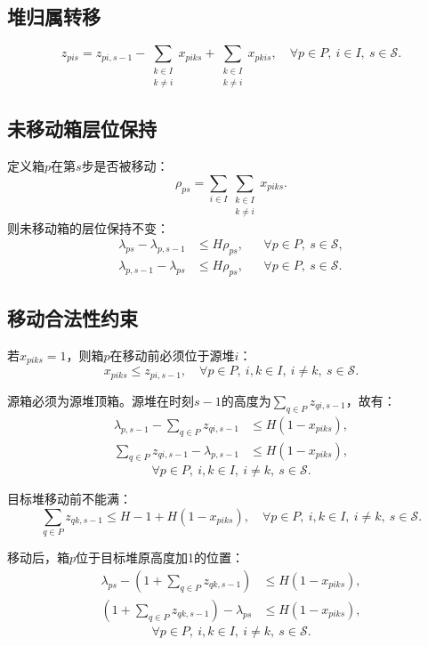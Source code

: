 \documentclass[11pt,a4paper]{ctexart}
\begin{document}
\subsection{堆归属转移}
\begin{equation}
z_{pis}=z_{pi,s-1}
-\sum_{\substack{k\in I\\k\ne i}}x_{piks}
+\sum_{\substack{k\in I\\k\ne i}}x_{pkis},
\quad \forall p\in P,\ i\in I,\ s\in\mathcal{S}.
\end{equation}

\subsection{未移动箱层位保持}
定义箱$p$在第$s$步是否被移动：
\begin{equation}
\rho_{ps}=\sum_{i\in I}\sum_{\substack{k\in I\\k\ne i}}x_{piks}.
\end{equation}
则未移动箱的层位保持不变：
\begin{align}
\lambda_{ps}-\lambda_{p,s-1} &\le H\rho_{ps},
&& \forall p\in P,\ s\in\mathcal{S},\\
\lambda_{p,s-1}-\lambda_{ps} &\le H\rho_{ps},
&& \forall p\in P,\ s\in\mathcal{S}.
\end{align}

\subsection{移动合法性约束}
若$x_{piks}=1$，则箱$p$在移动前必须位于源堆$i$：
\begin{equation}
x_{piks}\le z_{pi,s-1},
\quad \forall p\in P,\ i,k\in I,\ i\ne k,\ s\in\mathcal{S}.
\end{equation}

源箱必须为源堆顶箱。源堆在时刻$s-1$的高度为$\sum_{q\in P}z_{qi,s-1}$，故有：
\begin{align}
\lambda_{p,s-1}-\sum_{q\in P}z_{qi,s-1}
&\le H(1-x_{piks}),\\
\sum_{q\in P}z_{qi,s-1}-\lambda_{p,s-1}
&\le H(1-x_{piks}),
\end{align}
\[
\forall p\in P,\ i,k\in I,\ i\ne k,\ s\in\mathcal{S}.
\]

目标堆移动前不能满：
\begin{equation}
\sum_{q\in P}z_{qk,s-1}\le H-1+H(1-x_{piks}),
\quad \forall p\in P,\ i,k\in I,\ i\ne k,\ s\in\mathcal{S}.
\end{equation}

移动后，箱$p$位于目标堆原高度加1的位置：
\begin{align}
\lambda_{ps}-\left(1+\sum_{q\in P}z_{qk,s-1}\right)
&\le H(1-x_{piks}),\\
\left(1+\sum_{q\in P}z_{qk,s-1}\right)-\lambda_{ps}
&\le H(1-x_{piks}),
\end{align}
\[
\forall p\in P,\ i,k\in I,\ i\ne k,\ s\in\mathcal{S}.
\]
\end{document}
